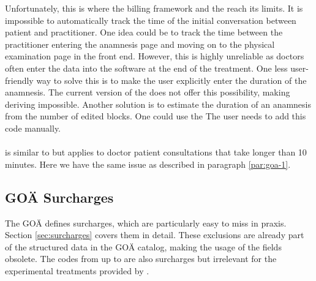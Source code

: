 Unfortunately, this is where the billing framework and the \AVS reach its limits.
It is impossible to automatically track the time of the initial conversation between patient and practitioner.
One idea could be to track the time between the practitioner entering the anamnesis page and moving on to the physical examination page in the front end.
However, this is highly unreliable as doctors often enter the data into the software at the end of the treatment.
One less user-friendly way to solve this is to make the user explicitly enter the duration of the anamnesis.
The current version of the \AVS does not offer this possibility, making deriving  impossible.
Another solution is to estimate the duration of an anamnesis from the number of edited blocks.
One could use the \minAnamnesi
The user needs to add this code manually.

\paragraph{}
 is similar to  but applies to doctor patient consultations that take longer than 10 minutes.
Here we have the same issue as described in paragraph \ref{par:goa-1}.


\subsection{GOÄ Surcharges}\label{subsec:goa-surcharges}
The GOÄ defines surcharges, which are particularly easy to miss in praxis.
Section \ref{sec:surcharges} covers them in detail.
These exclusions are already part of the structured data in the GOÄ catalog, making the usage of the  fields obsolete.
The codes from  up to  are also surcharges but irrelevant for the experimental treatments provided by \AV.








